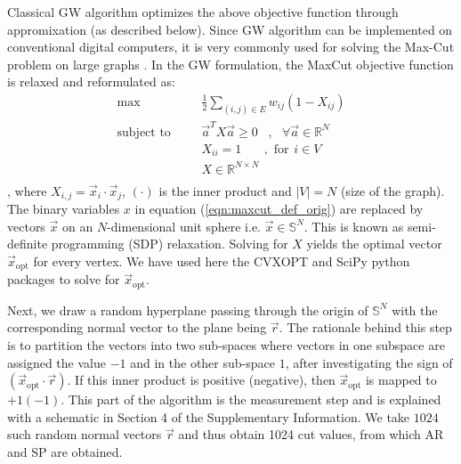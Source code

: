 \documentclass[10pt]{article}
\begin{document}
Classical GW algorithm 
optimizes the above objective function through appromixation (as described below). Since GW algorithm can be implemented on conventional digital computers, it is 
very commonly used for solving the Max-Cut problem on large graphs \cite{GW1}.
In the GW formulation, the MaxCut objective function is relaxed and reformulated as: 
\begin{equation}
\begin{split}
       \text{max}& \hspace{20pt} \frac{1}{2}\sum\limits_{(i,j)\in E}w_{ij}(1-X_{ij}) \\
       \text{subject to}& \hspace{20pt} \Vec{a}^T X \Vec{a}\ge 0 \hspace{10pt},\text{ } \forall \Vec{a}\in \mathbb{R}^N\\
       &\hspace{20pt} X_{ii}=1 \hspace{22pt},\text{ for} \hspace{5pt} i \in V\\
       &\hspace{20pt}  X\in \mathbb{R}^{N\times N}\\
\end{split}
\end{equation}
, where $X_{i,j}=\Vec{x}_i\cdot\Vec{x}_j$, $(\cdot)$ is the inner product and $|V|=N$ (size of the graph). The binary variables $x$ in equation (\ref{eqn:maxcut_def_orig}) are replaced by vectors $\Vec{x}$ on an $N$-dimensional unit sphere i.e. $\Vec{x}\in\mathbb{S}^N$. This is known as semi-definite programming (SDP) relaxation. Solving for $X$ yields the optimal vector $\Vec{x}_{\text{opt}}$ for every vertex. We have used here the CVXOPT \cite{andersen2013cvxopt} and SciPy \cite{2020SciPy-NMeth} python packages to solve for $\Vec{x}_{\text{opt}}$.


Next, we draw a random hyperplane passing through the origin of $\mathbb{S}^N$ with the corresponding normal vector to the plane being $\Vec{r}$. The rationale behind this step is to partition the vectors into two sub-spaces where vectors in one subspace are assigned the value $-1$ and in the other sub-space $1$, after investigating the sign of $(\Vec{x}_{\text{opt}}\cdot\vec{r})$. If this inner product is positive (negative), then $\Vec{x}_{\text{opt}}$ is mapped to $+1 (-1)$. This part of the algorithm is the measurement step and is explained with a schematic in Section 4 of the Supplementary Information.  We take $1024$ such random normal vectors $\Vec{r}$ and thus obtain 1024 cut values, from which AR and SP are obtained.
\end{document}
